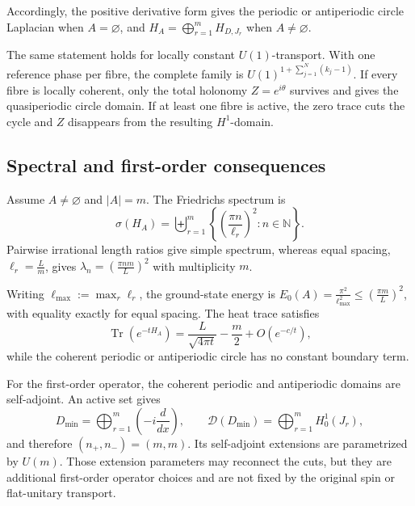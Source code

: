 \documentclass[11pt]{article}
\theoremstyle{plain}
\theoremstyle{definition}
\begin{document}
Accordingly, the positive derivative form gives the periodic or
antiperiodic circle Laplacian when \(A=\varnothing\), and \(H_A = \bigoplus_{r=1}^{m}H_{D,J_r}\) when \(A\neq\varnothing\).

The same statement holds for locally constant \(U(1)\)-transport. With one
reference phase per fibre, the complete family is
\(U(1)^{ 1+\sum_{j=1}^{N}(k_j-1) }\).
If every fibre is locally coherent, only the total holonomy \(Z=e^{i\theta}\) survives and gives the quasiperiodic circle domain. If at least one fibre is
active, the zero trace cuts the cycle and \(Z\) disappears from the
resulting \(H^1\)-domain.

\subsection{Spectral and first-order consequences}
\label{subsec:multisplit-circle-spectrum}
\label{subsec:multisplit-circle-first-order}

Assume \(A\neq\varnothing\) and \(|A|=m\). The Friedrichs spectrum is
\[
  \sigma(H_A)
  =
  \biguplus_{r=1}^{m}
  \left\{
    \left(
      \frac{\pi n}{\ell_r}
    \right)^2:
    n\in\mathbb N
  \right\}.
\]
Pairwise irrational length ratios give simple spectrum, whereas equal
spacing,
\(\ell_r=\frac{L}{m}\),
gives \(\lambda_n = \left( \frac{\pi nm}{L} \right)^2\) with multiplicity \(m\).

Writing
\(\ell_{\max}:=\max_r\ell_r\),
the ground-state energy is
\(E_0(A)=\frac{\pi^2}{\ell_{\max}^2} \leq \left( \frac{\pi m}{L} \right)^2\),
with equality exactly for equal spacing. The heat trace satisfies
\[
  \operatorname{Tr}(e^{-tH_A})
  =
  \frac{L}{\sqrt{4\pi t}}
  -
  \frac{m}{2}
  +
  O(e^{-c/t}),
\]
while the coherent periodic or antiperiodic circle has no constant boundary
term.

For the first-order operator, the coherent periodic and antiperiodic domains
are self-adjoint. An active set gives
\[
  D_{\min}
  =
  \bigoplus_{r=1}^{m}
  \left(
    -i\frac{d}{dx}
  \right),
  \qquad
  \mathcal D(D_{\min})
  =
  \bigoplus_{r=1}^{m}H^1_0(J_r),
\]
and therefore
\((n_+,n_-)=(m,m)\).
Its self-adjoint extensions are parametrized by \(U(m)\). Those extension
parameters may reconnect the cuts, but they are additional first-order
operator choices and are not fixed by the original spin or flat-unitary
transport.
\end{document}
